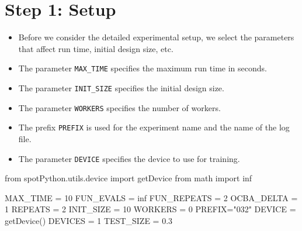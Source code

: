 \documentclass[
  letterpaper,
  DIV=11,
  numbers=noendperiod]{scrreprt}
\newenvironment{Shaded}{\begin{snugshade}}{\end{snugshade}}
\newcommand{\DecValTok}[1]{\textcolor[rgb]{0.68,0.00,0.00}{#1}}
\newcommand{\FloatTok}[1]{\textcolor[rgb]{0.68,0.00,0.00}{#1}}
\newcommand{\ImportTok}[1]{\textcolor[rgb]{0.00,0.46,0.62}{#1}}
\newcommand{\NormalTok}[1]{\textcolor[rgb]{0.00,0.23,0.31}{#1}}
\newcommand{\OperatorTok}[1]{\textcolor[rgb]{0.37,0.37,0.37}{#1}}
\newcommand{\StringTok}[1]{\textcolor[rgb]{0.13,0.47,0.30}{#1}}
\providecommand{\tightlist}{%
  \setlength{\itemsep}{0pt}\setlength{\parskip}{0pt}}\usepackage{longtable,booktabs,array}
\begin{document}
\section{Step 1: Setup}\label{sec-setup-31}

\begin{itemize}
\tightlist
\item
  Before we consider the detailed experimental setup, we select the
  parameters that affect run time, initial design size, etc.
\item
  The parameter \texttt{MAX\_TIME} specifies the maximum run time in
  seconds.
\item
  The parameter \texttt{INIT\_SIZE} specifies the initial design size.
\item
  The parameter \texttt{WORKERS} specifies the number of workers.
\item
  The prefix \texttt{PREFIX} is used for the experiment name and the
  name of the log file.
\item
  The parameter \texttt{DEVICE} specifies the device to use for
  training.
\end{itemize}

\begin{Shaded}
\begin{Highlighting}[]
\ImportTok{from}\NormalTok{ spotPython.utils.device }\ImportTok{import}\NormalTok{ getDevice}
\ImportTok{from}\NormalTok{ math }\ImportTok{import}\NormalTok{ inf}

\NormalTok{MAX\_TIME }\OperatorTok{=} \DecValTok{10}
\NormalTok{FUN\_EVALS }\OperatorTok{=}\NormalTok{ inf}
\NormalTok{FUN\_REPEATS }\OperatorTok{=} \DecValTok{2}
\NormalTok{OCBA\_DELTA }\OperatorTok{=} \DecValTok{1}
\NormalTok{REPEATS }\OperatorTok{=} \DecValTok{2}
\NormalTok{INIT\_SIZE }\OperatorTok{=} \DecValTok{10}
\NormalTok{WORKERS }\OperatorTok{=} \DecValTok{0}
\NormalTok{PREFIX}\OperatorTok{=}\StringTok{"032"}
\NormalTok{DEVICE }\OperatorTok{=}\NormalTok{ getDevice()}
\NormalTok{DEVICES }\OperatorTok{=} \DecValTok{1}
\NormalTok{TEST\_SIZE }\OperatorTok{=} \FloatTok{0.3}
\end{Highlighting}
\end{Shaded}
\end{document}
